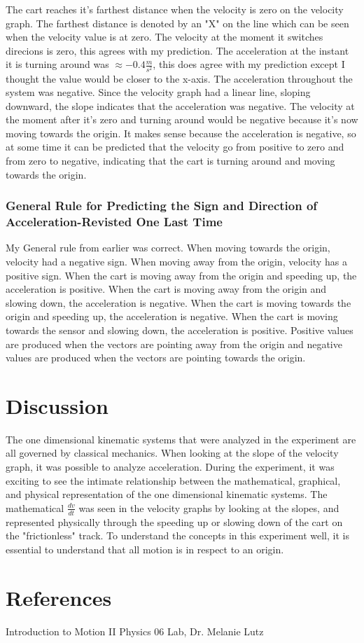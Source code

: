\documentclass[aps,letterpaper,11pt]{revtex4}
\begin{document}
The cart reaches it's farthest distance when the velocity is zero on the velocity graph. The farthest distance is denoted by an "X" on the line which can be seen when the velocity value is at zero. The velocity at the moment it switches direcions is zero, this agrees with my prediction. The acceleration at the instant it is turning around was $\approx -0.4 \frac{m}{s^2}$, this does agree with my prediction except I thought the value would be closer to the x-axis. The acceleration throughout the system was negative. Since the velocity graph had a linear line, sloping downward, the slope indicates that the acceleration was negative. The velocity at the moment after it's zero and turning around would be negative because it's now moving towards the origin. It makes sense because the acceleration is negative, so at some time it can be predicted that the velocity go from positive to zero and from zero to negative, indicating that the cart is turning around and moving towards the origin. 

\subsubsection{General Rule for Predicting the Sign and Direction of Acceleration-Revisted One Last Time}

My General rule from earlier was correct. When moving towards the origin, velocity had a negative sign. When moving away from the origin, velocity has a positive sign. When the cart is moving away from the origin and speeding up, the acceleration is positive. When the cart is moving away from the origin and slowing down, the acceleration is negative. When the cart is moving towards the origin and speeding up, the acceleration is negative. When the cart is moving towards the sensor and slowing down, the acceleration is positive. Positive values are produced when the vectors are pointing away from the origin and negative values are produced when the vectors are pointing towards the origin.


\section{Discussion} 

The one dimensional kinematic systems that were analyzed in the experiment are all governed by classical mechanics. When looking at the slope of the velocity graph, it was possible to analyze acceleration. During the experiment, it was exciting to see the intimate relationship between the mathematical, graphical, and physical representation of the one dimensional kinematic systems. The mathematical $\frac{dv}{dt}$ was seen in the velocity graphs by looking at the slopes, and represented physically through the speeding up or slowing down of the cart on the "frictionless" track. To understand the concepts in this experiment well, it is essential to understand that all motion is in respect to an origin.  



\section{References}

\hspace{-6.5mm}
Introduction to Motion II Physics 06 Lab, Dr. Melanie Lutz\\
\end{document}

